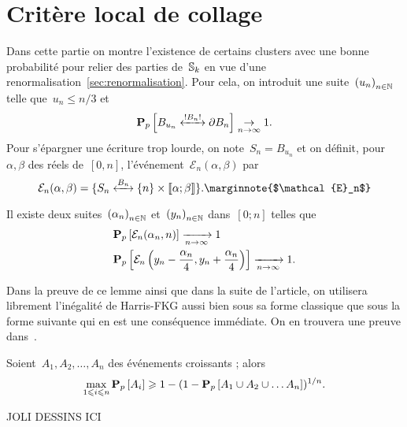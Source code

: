 \section{Critère local de collage}
Dans cette partie on montre l'existence de certains clusters avec une bonne probabilité pour relier des parties de~$\mathbb{S}_k$ en vue d'une renormalisation~\ref{sec:renormalisation}. Pour cela, on introduit une suite~$\suite{u}$ telle que~$u_n \leqslant n/3$ et %
	\begin{equation}\label{eq:toucherBordCarre}
		\Pp{\relie*[B_n]{B_{u_n}}{\partial B_n}} \underset{n \to \infty}{\to} 1. 
	\end{equation}
	Pour s'épargner une écriture trop lourde, on note~$S_n = B_{u_n}$  et on définit, pour~$\alpha, \beta$ des réels de~$[0, n]$, l'événement~$\mathcal{E}_n(\alpha, \beta)$ par
	\[
		\mathcal{E}_n( \alpha, \beta ) = \{\relie[B_n]{S_n}{\{n\} \times \llbracket \alpha ; \beta \rrbracket} \}. \marginnote{$\mathcal{E}_n$}
	\]
	
	\begin{lem}\label{lem:collagesElem} 
		Il existe deux suites~$\suite{\alpha}$ et~$\suite{y}$ dans~$[0; n]$ telles que
		\begin{align*}
			  &\bm{\mathrm{P}}_{p}\left[\mathcal{E}_n(\alpha_n, n)\right] \xrightarrow[n\to\infty]{} 1 \\ 
			  &\bm{\mathrm{P}}_{p}\left[\mathcal{E}_n\left(y_n - \frac{\alpha_n}{4}, y_n + \frac{\alpha_n}{4}\right)\right] \xrightarrow[n \to \infty]{} 1.
		\end{align*}
	\end{lem}
	Dans la preuve de ce lemme ainsi que dans la suite de l'article, on utilisera librement l'inégalité de Harris-FKG aussi bien sous sa forme classique que sous la forme suivante qui en est une conséquence immédiate. On en trouvera une preuve dans~\cite{Grimmett}. 
	\begin{lem}\label{lem:HarrisFKG}
		Soient~$A_1, A_2, \ldots, A_n$ des événements croissants ; alors
		\[
			\max_{1 \leqslant i \leqslant n} \bm{\mathrm{P}}_{p}\left[A_i\right] \geqslant 1 - (1 - \bm{\mathrm{P}}_{p}\left[A_1 \cup A_2 \cup \ldots A_n\right])^{1/n}. 
		\]
	\end{lem}
	
	JOLI DESSINS ICI %

